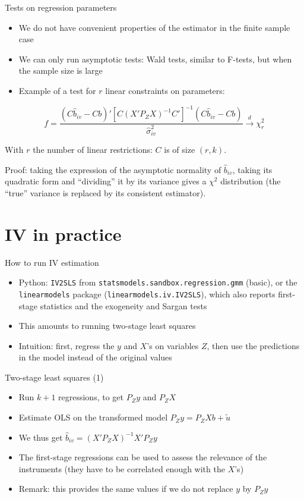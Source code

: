 \documentclass[aspectratio=169]{beamer}
\begin{document}
\begin{frame}{Tests on regression parameters}
\begin{itemize}
    \item We do not have convenient properties of the estimator in the finite sample case
    \item We can only run asymptotic tests: Wald tests, similar to F-tests, but when the sample size is large
    \item Example of a test for $r$ linear constraints on parameters:
\end{itemize}

\[f = \frac{(C\hat{b}_{iv} - Cb)'[C(X'P_ZX)^{-1}C']^{-1}(C\hat{b}_{iv} - Cb)}{\hat{\sigma}_{iv}^2} \xrightarrow{d} \chi_r^2\]

With $r$ the number of linear restrictions: $C$ is of size $(r,k)$.

Proof: taking the expression of the asymptotic normality of $\hat{b}_{iv}$, taking its quadratic form and ``dividing'' it by its variance gives a $\chi^2$ distribution (the ``true'' variance is replaced by its consistent estimator).
\end{frame}

\section{IV in practice}

\begin{frame}{How to run IV estimation}
\begin{itemize}
    \item Python: \texttt{IV2SLS} from \texttt{statsmodels.sandbox.regression.gmm} (basic), or the \texttt{linearmodels} package (\texttt{linearmodels.iv.IV2SLS}), which also reports first-stage statistics and the exogeneity and Sargan tests
    \item This amounts to running two-stage least squares
    \item Intuition: first, regress the $y$ and $X$'s on variables $Z$, then use the predictions in the model instead of the original values
\end{itemize}
\end{frame}

\begin{frame}{Two-stage least squares (1)}
\begin{itemize}
    \item Run $k+1$ regressions, to get $P_Zy$ and $P_ZX$
    \item Estimate OLS on the transformed model $P_Zy = P_ZXb + \tilde{u}$
    \item We thus get $\hat{b}_{iv} = (X'P_ZX)^{-1}X'P_Zy$
    \item The first-stage regressions can be used to assess the relevance of the instruments (they have to be correlated enough with the $X$'s)
    \item Remark: this provides the same values if we do not replace $y$ by $P_Zy$
\end{itemize}
\end{frame}
\end{document}
